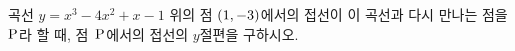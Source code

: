 곡선 $y=x^3-4x^2+x-1$ 위의 점 $(1{,}\mkern3mu\mathopen{}-3)$에서의 접선이 이 곡선과 다시 만나는 점을 $\mathrm{P}$라 할 때, 점~$\mathrm{P}$에서의 접선의 $y$절편을 구하시오.
